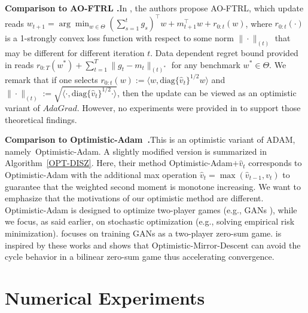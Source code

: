 \documentclass[wcp]{jmlr}
\begin{document}
\noindent \textbf{Comparison to AO-FTRL \citep{MY16}.}\hspace{0.1in}In \citet{MY16}, the authors propose AO-FTRL, which update reads $w_{t+1} = \arg\min_{{w \in \Theta}} ( \sum_{s=1}^t g_s )^{\top}  w + m_{t+1}^\top w + r_{0:t}(w) $, where $r_{0:t}(\cdot)$ is a 1-strongly convex loss function with respect to some norm $\| \cdot\|_{(t)}$ that may be different for different iteration $t$. 
Data dependent regret bound provided in \citet{MY16} reads $r_{{0:T}}(w^*) + \sum_{t=1}^T \| g_t - m_t \|_{(t)^*}$ for any benchmark $w^{*} \in \Theta$. 
We remark that if one selects $r_{0:t}(w) := \langle w, \text{diag}\{\hat{v}_t\}^{1/2} w \rangle$  and $\| \cdot \|_{(t)}:=  \sqrt{ \langle \cdot, \text{diag}\{\hat{v}_t\}^{1/2} \cdot \rangle }$, then the update can be viewed as an optimistic variant of $AdaGrad$. 
However, no experiments were provided in \citet{MY16} to support those theoretical findings.

\noindent \textbf{Comparison to Optimistic-Adam~\citep{DISZ18}.}This is an optimistic variant of ADAM, namely~Optimistic-Adam. 
A slightly modified version is summarized in Algorithm~\ref{OPT-DISZ}. 
Here, their method Optimistic-Adam$+\hat{v}_t$ corresponds to Optimistic-Adam with the additional max operation $\hat{v}_t = \max ( \hat{v}_{t-1}, v_t)$ to guarantee that the weighted second moment is monotone increasing.
We want to emphasize that the motivations of our optimistic method are different. 
Optimistic-Adam is designed to optimize two-player games (e.g., GANs \citep{goodfellow2014generative}), while we focus, as said earlier, on stochastic optimization (e.g., solving empirical risk minimization).
\citep{DISZ18} focuses on training GANs as a two-player zero-sum game. 
\citep{DISZ18} is inspired by these works and shows that Optimistic-Mirror-Descent can avoid the cycle behavior in a bilinear zero-sum game thus accelerating convergence. 



\vspace{-0.05in}
\section{Numerical Experiments}\label{sec:numerical}
\vspace{-0.05in}

%
\end{document}
